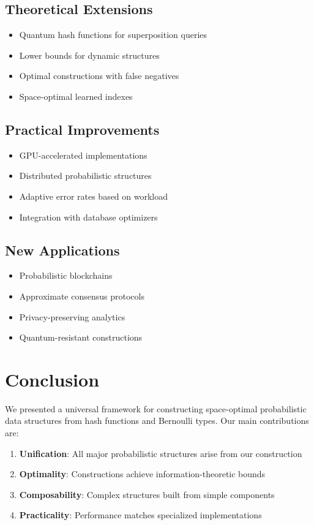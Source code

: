\documentclass[11pt]{article}
\begin{document}
\subsection{Theoretical Extensions}
\begin{itemize}
\item Quantum hash functions for superposition queries
\item Lower bounds for dynamic structures
\item Optimal constructions with false negatives
\item Space-optimal learned indexes
\end{itemize}

\subsection{Practical Improvements}
\begin{itemize}
\item GPU-accelerated implementations
\item Distributed probabilistic structures
\item Adaptive error rates based on workload
\item Integration with database optimizers
\end{itemize}

\subsection{New Applications}
\begin{itemize}
\item Probabilistic blockchains
\item Approximate consensus protocols
\item Privacy-preserving analytics
\item Quantum-resistant constructions
\end{itemize}

\section{Conclusion}

We presented a universal framework for constructing space-optimal probabilistic data structures from hash functions and Bernoulli types. Our main contributions are:

\begin{enumerate}
\item \textbf{Unification}: All major probabilistic structures arise from our construction
\item \textbf{Optimality}: Constructions achieve information-theoretic bounds
\item \textbf{Composability}: Complex structures built from simple components
\item \textbf{Practicality}: Performance matches specialized implementations
\end{enumerate}
\end{document}
